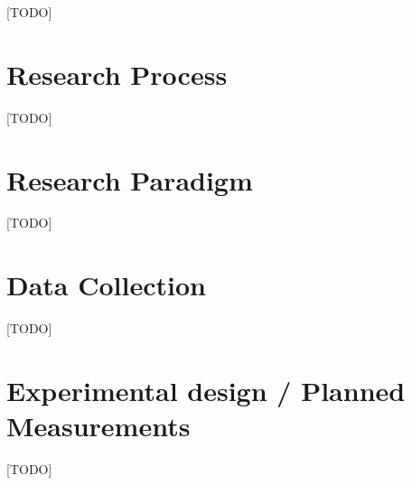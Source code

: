 [TODO]

\section{Research Process} \label{sec:researchProcess}
[TODO]

\section{Research Paradigm} \label{sec:researchParadigm}
[TODO]

\section{Data Collection} \label{sec:dataCollection}
[TODO]

\section{Experimental design / Planned Measurements} \label{sec:experimentalDesign}
[TODO]

